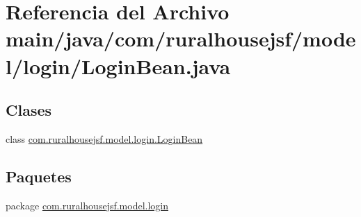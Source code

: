 \hypertarget{a00080}{}\section{Referencia del Archivo main/java/com/ruralhousejsf/model/login/\+Login\+Bean.java}
\label{a00080}
\subsection*{Clases}
\begin{DoxyCompactItemize}
\item 
class \mbox{\hyperlink{a00232}{com.\+ruralhousejsf.\+model.\+login.\+Login\+Bean}}
\end{DoxyCompactItemize}
\subsection*{Paquetes}
\begin{DoxyCompactItemize}
\item 
package \mbox{\hyperlink{a00122}{com.\+ruralhousejsf.\+model.\+login}}
\end{DoxyCompactItemize}
